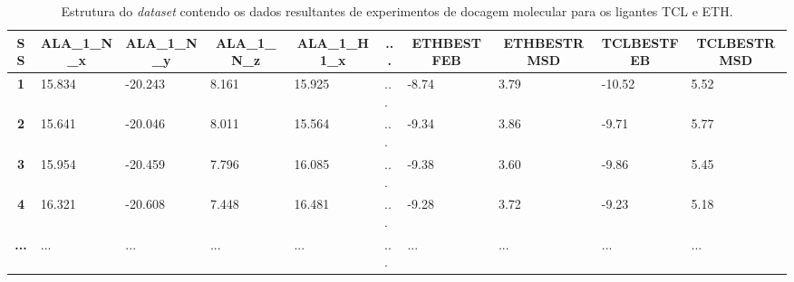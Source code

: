 \begin{table}[h]
\label{tab:dataset}
\caption{Estrutura do \emph{dataset} contendo os dados resultantes de experimentos de docagem molecular para os ligantes TCL e ETH.}
\begin{tabular}{c|l|l|l|l|l|l|l|l|l}
\hline
\textbf{SS}   & \multicolumn{1}{c|}{\textbf{ALA\_1\_N\_x}} & \multicolumn{1}{c|}{\textbf{ALA\_1\_N\_y}} & \multicolumn{1}{c|}{\textbf{ALA\_1\_N\_z}} & \multicolumn{1}{c|}{\textbf{ALA\_1\_H1\_x}} & \multicolumn{1}{c|}{\textbf{...}} & \multicolumn{1}{c|}{\textbf{ETHBESTFEB}} & \multicolumn{1}{c|}{\textbf{ETHBESTRMSD}} & \multicolumn{1}{c|}{\textbf{TCLBESTFEB}} & \multicolumn{1}{c}{\textbf{TCLBESTRMSD}} \\ \hline
\textbf{1}    & 15.834                                     & -20.243                                    & 8.161                                      & 15.925                                      & ...                               & -8.74                                    & 3.79                                      & -10.52                                   & 5.52                                     \\ \hline
\textbf{2}    & 15.641                                     & -20.046                                    & 8.011                                      & 15.564                                      & ...                               & -9.34                                    & 3.86                                      & -9.71                                    & 5.77                                     \\ \hline
\textbf{3}    & 15.954                                     & -20.459                                    & 7.796                                      & 16.085                                      & ...                               & -9.38                                    & 3.60                                      & -9.86                                    & 5.45                                     \\ \hline
\textbf{4}    & 16.321                                     & -20.608                                    & 7.448                                      & 16.481                                      & ...                               & -9.28                                    & 3.72                                      & -9.23                                    & 5.18                                     \\ \hline
\textbf{...}  & ...                                        & ...                                        & ...                                        & ...                                         & ...                               & ...                                      & ...                                       & ...                                      & ...                                      \\ \hline

\end{tabular}
\end{table}
